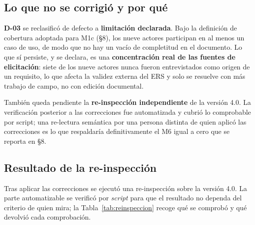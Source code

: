 \subsection{Lo que no se corrigi\'o y por qu\'e}

\textbf{D-03} se reclasific\'o de defecto a \textbf{limitaci\'on declarada}. Bajo la definici\'on de cobertura adoptada para M1c (\S8), los nueve actores participan en al menos un caso de uso, de modo que no hay un vac\'io de completitud en el documento. Lo que s\'i persiste, y se declara, es una \textbf{concentraci\'on real de las fuentes de elicitaci\'on}: siete de los nueve actores nunca fueron entrevistados como origen de un requisito, lo que afecta la validez externa del ERS y solo se resuelve con m\'as trabajo de campo, no con edici\'on documental.

Tambi\'en queda pendiente la \textbf{re-inspecci\'on independiente} de la versi\'on 4.0. La verificaci\'on posterior a las correcciones fue automatizada y cubri\'o lo comprobable por script; una re-lectura sem\'antica por una persona distinta de quien aplic\'o las correcciones es lo que respaldar\'ia definitivamente el M6 igual a cero que se reporta en \S8.

\subsection{Resultado de la re-inspecci\'on}

Tras aplicar las correcciones se ejecut\'o una re-inspecci\'on sobre la versi\'on 4.0. La parte automatizable se verific\'o por \emph{script} para que el resultado no dependa del criterio de quien mira; la Tabla~\ref{tab:reinspeccion} recoge qu\'e se comprob\'o y qu\'e devolvi\'o cada comprobaci\'on.

